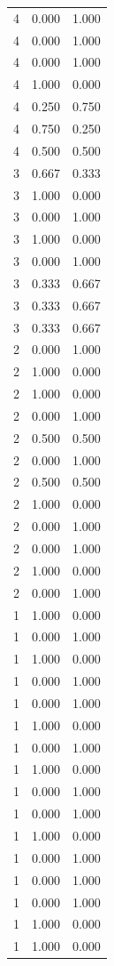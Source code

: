 \begin{tabular}{rrr}
4 & 0.000 & 1.000 \\
4 & 0.000 & 1.000 \\
4 & 0.000 & 1.000 \\
4 & 1.000 & 0.000 \\
4 & 0.250 & 0.750 \\
4 & 0.750 & 0.250 \\
4 & 0.500 & 0.500 \\
3 & 0.667 & 0.333 \\
3 & 1.000 & 0.000 \\
3 & 0.000 & 1.000 \\
3 & 1.000 & 0.000 \\
3 & 0.000 & 1.000 \\
3 & 0.333 & 0.667 \\
3 & 0.333 & 0.667 \\
3 & 0.333 & 0.667 \\
2 & 0.000 & 1.000 \\
2 & 1.000 & 0.000 \\
2 & 1.000 & 0.000 \\
2 & 0.000 & 1.000 \\
2 & 0.500 & 0.500 \\
2 & 0.000 & 1.000 \\
2 & 0.500 & 0.500 \\
2 & 1.000 & 0.000 \\
2 & 0.000 & 1.000 \\
2 & 0.000 & 1.000 \\
2 & 1.000 & 0.000 \\
2 & 0.000 & 1.000 \\
1 & 1.000 & 0.000 \\
1 & 0.000 & 1.000 \\
1 & 1.000 & 0.000 \\
1 & 0.000 & 1.000 \\
1 & 0.000 & 1.000 \\
1 & 1.000 & 0.000 \\
1 & 0.000 & 1.000 \\
1 & 1.000 & 0.000 \\
1 & 0.000 & 1.000 \\
1 & 0.000 & 1.000 \\
1 & 1.000 & 0.000 \\
1 & 0.000 & 1.000 \\
1 & 0.000 & 1.000 \\
1 & 0.000 & 1.000 \\
1 & 1.000 & 0.000 \\
1 & 1.000 & 0.000 \\

\end{tabular}
